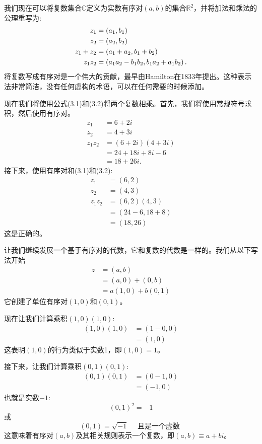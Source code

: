 我们现在可以将复数集合$\mathbb{C}$定义为实数有序对$(a, b)$的集合$\mathbb{R}^{2}$，并将加法和乘法的公理重写为:
\begin{align}
z_{1} & =\left(a_{1}, b_{1}\right) \notag\\
z_{2} & =\left(a_{2}, b_{2}\right) \notag\\
z_{1}+z_{2} & =\left(a_{1}+a_{2}, b_{1}+b_{2}\right) \label{Z.1}\\
z_{1} z_{2} & =\left(a_{1} a_{2}-b_{1} b_{2}, b_{1} a_{2}+a_{1} b_{2}\right) .\label{Z.2}
\end{align}
将复数写成有序对是一个伟大的贡献，最早由Hamilton在1833年提出。这种表示法非常简洁，没有任何虚构的术语，可以在任何需要的时候添加。

现在我们将使用公式(3.1)和(3.2)将两个复数相乘。首先，我们将使用常规符号求积，然后使用有序对。
$$
\begin{aligned}
z_{1} & =6+2 i \\
z_{2} & =4+3 i \\
z_{1} z_{2} & =(6+2 i)(4+3 i) \\
& =24+18 i+8 i-6 \\
& =18+26 i .
\end{aligned}
$$
接下来，使用有序对和(3.1)和(3.2):
$$
\begin{aligned}
z_{1} & =(6,2) \\
z_{2} & =(4,3) \\
z_{1} z_{2} & =(6,2)(4,3) \\
& =(24-6,18+8) \\
& =(18,26)
\end{aligned}
$$
这是正确的。

让我们继续发展一个基于有序对的代数，它和复数的代数是一样的。我们从以下写法开始
$$
\begin{aligned}
z & =(a, b) \\
& =(a, 0)+(0, b) \\
& =a(1,0)+b(0,1)
\end{aligned}
$$
它创建了单位有序对$(1,0)$和$(0,1)$。

现在让我们计算乘积$(1,0)(1,0)$:
$$
\begin{aligned}
(1,0)(1,0) & =(1-0,0) \\
& =(1,0)
\end{aligned}
$$
这表明$(1,0)$的行为类似于实数1，即$(1,0)=1$。

接下来，让我们计算乘积$(0,1)(0,1)$:
$$
\begin{aligned}
(0,1)(0,1) & =(0-1,0) \\
& =(-1,0)
\end{aligned}
$$
也就是实数$-1$:
$$
(0,1)^{2}=-1
$$
或
$$
(0,1)=\sqrt{-1} \quad \text { 且是一个虚数 }
$$
这意味着有序对$(a, b)$及其相关规则表示一个复数，即$(a, b) \equiv a+ bi $。

